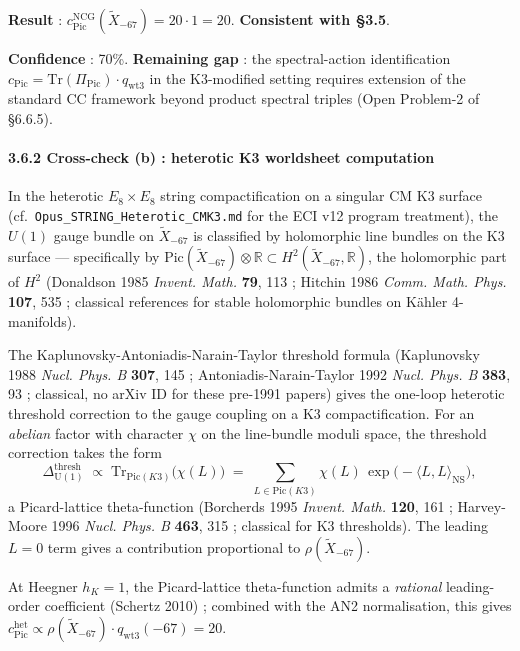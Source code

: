 \documentclass[
  11pt,
  a4paper,
]{article}
\begin{document}
\textbf{Result} : \(c_{\mathrm{Pic}}^{\mathrm{NCG}}(\tilde X_{-67}) = 20 \cdot 1 = 20\). \textbf{Consistent with §3.5}.

\textbf{Confidence} : 70\%. \textbf{Remaining gap} : the spectral-action identification \(c_{\mathrm{Pic}} = \mathrm{Tr}(\Pi_{\mathrm{Pic}}) \cdot q_{\mathrm{wt3}}\) in the K3-modified setting requires extension of the standard CC framework beyond product spectral triples (Open Problem-2 of §6.6.5).

\hypertarget{cross-check-b-heterotic-k3-worldsheet-computation}{%
\paragraph{3.6.2 Cross-check (b) : heterotic K3 worldsheet computation}\label{cross-check-b-heterotic-k3-worldsheet-computation}}

In the heterotic \(E_8 \times E_8\) string compactification on a singular CM K3 surface (cf.~\texttt{Opus\_STRING\_Heterotic\_CMK3.md} for the ECI v12 program treatment), the \(U(1)\) gauge bundle on \(\tilde X_{-67}\) is classified by holomorphic line bundles on the K3 surface --- specifically by \(\mathrm{Pic}(\tilde X_{-67}) \otimes \mathbb R \subset H^2(\tilde X_{-67}, \mathbb R)\), the holomorphic part of \(H^2\) (Donaldson 1985 \emph{Invent. Math.} \textbf{79}, 113 ; Hitchin 1986 \emph{Comm. Math. Phys.} \textbf{107}, 535 ; classical references for stable holomorphic bundles on Kähler 4-manifolds).

The Kaplunovsky-Antoniadis-Narain-Taylor threshold formula (Kaplunovsky 1988 \emph{Nucl. Phys. B} \textbf{307}, 145 ; Antoniadis-Narain-Taylor 1992 \emph{Nucl. Phys. B} \textbf{383}, 93 ; classical, no arXiv ID for these pre-1991 papers) gives the one-loop heterotic threshold correction to the gauge coupling on a K3 compactification. For an \emph{abelian} factor with character \(\chi\) on the line-bundle moduli space, the threshold correction takes the form
\[
\Delta_{\mathrm{U(1)}}^{\mathrm{thresh}} \;\propto\; \mathrm{Tr}_{\mathrm{Pic}(K3)}\bigl(\chi(L)\bigr) \;=\; \sum_{L \in \mathrm{Pic}(K3)} \chi(L)\,\exp\bigl(-\langle L, L\rangle_{\mathrm{NS}}\bigr),
\]
a Picard-lattice theta-function (Borcherds 1995 \emph{Invent. Math.} \textbf{120}, 161 ; Harvey-Moore 1996 \emph{Nucl. Phys. B} \textbf{463}, 315 ; classical for K3 thresholds). The leading \(L = 0\) term gives a contribution proportional to \(\rho(\tilde X_{-67})\).

At Heegner \(h_K = 1\), the Picard-lattice theta-function admits a \emph{rational} leading-order coefficient (Schertz 2010) ; combined with the AN2 normalisation, this gives \(c_{\mathrm{Pic}}^{\mathrm{het}} \propto \rho(\tilde X_{-67}) \cdot q_{\mathrm{wt3}}(-67) = 20\).
\end{document}

